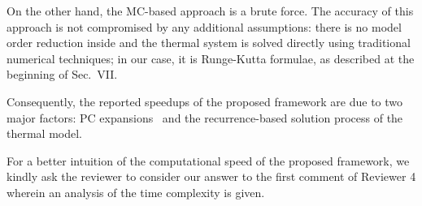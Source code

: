 \begin{authors}
On the other hand, the MC-based approach is a brute force.
The accuracy of this approach is not compromised by any additional assumptions: there is no model order reduction inside and the thermal system is solved directly using traditional numerical techniques; in our case, it is Runge-Kutta formulae, as described at the beginning of Sec.~VII.

Consequently, the reported speedups of the proposed framework are due to two major factors: PC expansions \perse\ and the recurrence-based solution process of the thermal model.

For a better intuition of the computational speed of the proposed framework, we kindly ask the reviewer to consider our answer to the first comment of Reviewer 4 wherein an analysis of the time complexity is given.

\end{authors}
